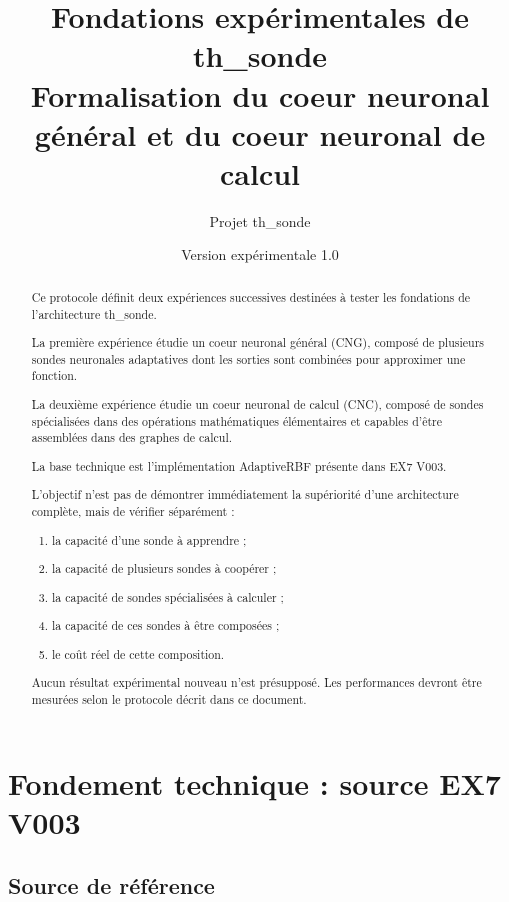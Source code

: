 \documentclass[11pt,a4paper]{article}
\title{
    \textbf{Fondations expérimentales de th\_sonde}\\
    \large Formalisation du coeur neuronal général et du coeur neuronal de calcul
}
\author{Projet th\_sonde}
\date{Version expérimentale 1.0}
\newcommand{\CNG}{\textsc{CNG}}
\newcommand{\CNC}{\textsc{CNC}}
\begin{document}
\maketitle

\begin{abstract}
Ce protocole définit deux expériences successives destinées
à tester les fondations de l'architecture th\_sonde.

La première expérience étudie un coeur neuronal général
(\CNG), composé de plusieurs sondes neuronales adaptatives
dont les sorties sont combinées pour approximer une fonction.

La deuxième expérience étudie un coeur neuronal de calcul
(\CNC), composé de sondes spécialisées dans des opérations
mathématiques élémentaires et capables d'être assemblées
dans des graphes de calcul.

La base technique est l'implémentation AdaptiveRBF
présente dans EX7 V003.

L'objectif n'est pas de démontrer immédiatement la
supériorité d'une architecture complète, mais de vérifier
séparément :
\begin{enumerate}
    \item la capacité d'une sonde à apprendre ;
    \item la capacité de plusieurs sondes à coopérer ;
    \item la capacité de sondes spécialisées à calculer ;
    \item la capacité de ces sondes à être composées ;
    \item le coût réel de cette composition.
\end{enumerate}

Aucun résultat expérimental nouveau n'est présupposé.
Les performances devront être mesurées selon le protocole
décrit dans ce document.
\end{abstract}

\tableofcontents
\newpage

\section{Fondement technique : source EX7 V003}

\subsection{Source de référence}
\end{document}
